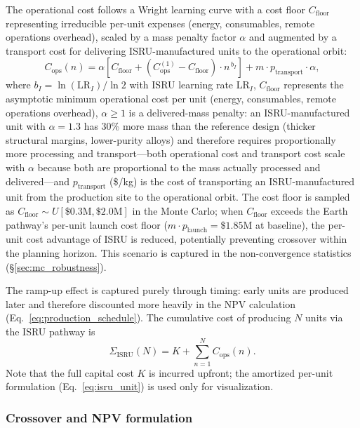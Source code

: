 \documentclass[preprint,12pt]{elsarticle}
\begin{document}
The operational cost follows a Wright learning curve with a cost floor $C_{\mathrm{floor}}$ representing irreducible per-unit expenses (energy, consumables, remote operations overhead), scaled by a mass penalty factor $\alpha$ and augmented by a transport cost for delivering ISRU-manufactured units to the operational orbit:
\begin{equation}
  C_{\mathrm{ops}}(n) = \alpha \left[ C_{\mathrm{floor}} + \left(C_{\mathrm{ops}}^{(1)} - C_{\mathrm{floor}}\right) \cdot n^{\,b_I} \right] + m \cdot p_{\mathrm{transport}} \cdot \alpha,
  \label{eq:isru_ops}
\end{equation}
where $b_I = \ln(\mathrm{LR}_I)/\ln 2$ with ISRU learning rate $\mathrm{LR}_I$, $C_{\mathrm{floor}}$ represents the asymptotic minimum operational cost per unit (energy, consumables, remote operations overhead), $\alpha \geq 1$ is a delivered-mass penalty: an ISRU-manufactured unit with $\alpha = 1.3$ has 30\% more mass than the reference design (thicker structural margins, lower-purity alloys) and therefore requires proportionally more processing and transport---both operational cost and transport cost scale with $\alpha$ because both are proportional to the mass actually processed and delivered---and $p_{\mathrm{transport}}$ (\$/kg) is the cost of transporting an ISRU-manufactured unit from the production site to the operational orbit. The cost floor is sampled as $C_{\mathrm{floor}} \sim U[\$0.3\text{M}, \$2.0\text{M}]$ in the Monte Carlo; when $C_{\mathrm{floor}}$ exceeds the Earth pathway's per-unit launch cost floor ($m \cdot p_{\mathrm{launch}} = \$1.85$M at baseline), the per-unit cost advantage of ISRU is reduced, potentially preventing crossover within the planning horizon. This scenario is captured in the non-convergence statistics (\S\ref{sec:mc_robustness}).

The ramp-up effect is captured purely through timing: early units are produced later and therefore discounted more heavily in the NPV calculation (Eq.~\ref{eq:production_schedule}). The cumulative cost of producing $N$ units via the ISRU pathway is
\begin{equation}
  \Sigma_{\mathrm{ISRU}}(N) = K + \sum_{n=1}^{N} C_{\mathrm{ops}}(n).
  \label{eq:isru_cum}
\end{equation}
Note that the full capital cost $K$ is incurred upfront; the amortized per-unit formulation (Eq.~\ref{eq:isru_unit}) is used only for visualization.

\subsubsection{Crossover and NPV formulation}
\end{document}
